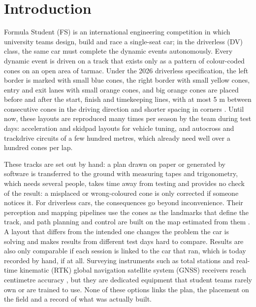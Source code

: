 \section{Introduction}
Formula Student (FS) is an international engineering competition in which university teams design, build and race a single-seat car; in the driverless (DV) class, the same car must complete the dynamic events autonomously. Every dynamic event is driven on a track that exists only as a pattern of colour-coded cones on an open area of tarmac. Under the 2026 driverless specification, the left border is marked with small blue cones, the right border with small yellow cones, entry and exit lanes with small orange cones, and big orange cones are placed before and after the start, finish and timekeeping lines, with at most 5 m between consecutive cones in the driving direction and shorter spacing in corners \cite{fsds2026}. Until now, these layouts are reproduced many times per season by the team during test days: acceleration and skidpad layouts for vehicle tuning, and autocross and trackdrive circuits of a few hundred metres, which already need well over a hundred cones per lap.

These tracks are set out by hand: a plan drawn on paper or generated by software is transferred to the ground with measuring tapes and trigonometry, which needs several people, takes time away from testing and provides no check of the result: a misplaced or wrong-coloured cone is only corrected if someone notices it. For driverless cars, the consequences go beyond inconvenience. Their perception and mapping pipelines use the cones as the landmarks that define the track, and path planning and control are built on the map estimated from them \cite{kabzan2020}. A layout that differs from the intended one changes the problem the car is solving and makes results from different test days hard to compare. Results are also only comparable if each session is linked to the car that ran, which is today recorded by hand, if at all. Surveying instruments such as total stations and real-time kinematic (RTK) global navigation satellite system (GNSS) receivers reach centimetre accuracy \cite{jiang2023}, but they are dedicated equipment that student teams rarely own or are trained to use. None of these options links the plan, the placement on the field and a record of what was actually built.

